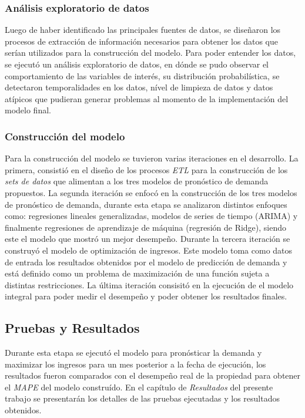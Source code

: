 \subsubsection*{Análisis exploratorio de datos}

Luego de haber identificado las principales fuentes de datos, se diseñaron los procesos de extracción de información necesarios para obtener los datos que serían utilizados para la construcción del modelo. Para poder entender los datos, se ejecutó un análisis exploratorio de datos, en dónde se pudo observar el comportamiento de las variables de interés, su distribución probabilística, se detectaron temporalidades en los datos, nível de limpieza de datos y datos atípicos que pudieran generar problemas al momento de la implementación del modelo final.

\subsubsection*{Construcción del modelo}

Para la construcción del modelo se tuvieron varias iteraciones en el desarrollo. La primera, consistió en el diseño de los procesos \emph{ETL} para la construcción de los \emph{sets de datos} que alimentan a los tres modelos de pronóstico de demanda propuestos. La segunda iteración se enfocó en la construcción de los tres modelos de pronóstico de demanda, durante esta etapa se analizaron distintos enfoques como: regresiones lineales generalizadas, modelos de series de tiempo (ARIMA) y finalmente regresiones de aprendizaje de máquina (regresión de Ridge), siendo este el modelo que mostró un mejor desempeño. Durante la tercera iteración se construyó el modelo de optimización de ingresos. Este modelo toma como datos de entrada los resultados obtenidos por el modelo de predicción de demanda y está definido como un problema de maximización de una función sujeta a distintas restricciones. La última iteración consisitó en la ejecución de el modelo integral para poder medir el desempeño y poder obtener los resultados finales.

\subsection*{Pruebas y Resultados}

Durante esta etapa se ejecutó el modelo para pronósticar la demanda y maximizar los ingresos para un mes posterior a la fecha de ejecución, los resultados fueron comparados con el desempeño real de la propiedad para obtener el \emph{MAPE} del modelo construído. En el capítulo de \emph{Resultados} del presente trabajo se presentarán los detalles de las pruebas ejecutadas y los resultados obtenidos.
